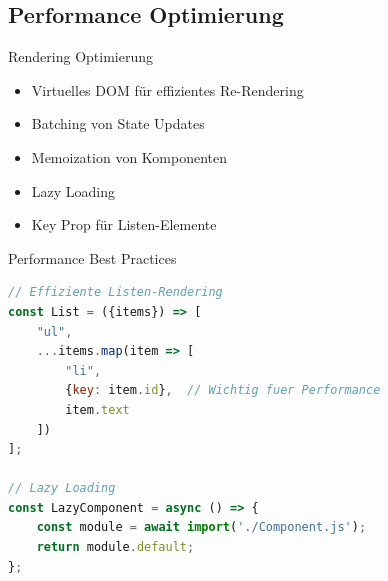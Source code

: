 \subsection{Performance Optimierung}

\begin{concept}{Rendering Optimierung}
    \begin{itemize}
        \item Virtuelles DOM für effizientes Re-Rendering
        \item Batching von State Updates
        \item Memoization von Komponenten
        \item Lazy Loading
        \item Key Prop für Listen-Elemente
    \end{itemize}
\end{concept}

\begin{KR}{Performance Best Practices}
\begin{lstlisting}[language=JavaScript, style=basesmol]
// Effiziente Listen-Rendering
const List = ({items}) => [
    "ul",
    ...items.map(item => [
        "li",
        {key: item.id},  // Wichtig fuer Performance
        item.text
    ])
];

// Lazy Loading
const LazyComponent = async () => {
    const module = await import('./Component.js');
    return module.default;
};
\end{lstlisting}
\end{KR}